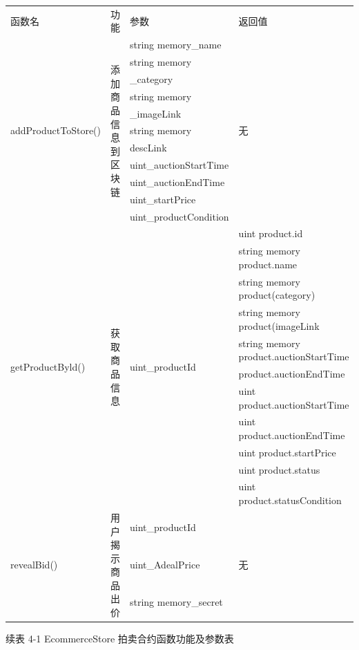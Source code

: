 \documentclass[
  10
]{article}
\newcounter{none} %
\begin{document}
{\def\LTcaptype{none} %
\begin{longtable}[]{@{}llll@{}}
\toprule\noalign{}
\endhead
\bottomrule\noalign{}
\endlastfoot
函数名 & 功能 & 参数 & 返回值 \\
\multirow{11}{*}{addProductToStore()} &
\multirow{11}{*}{添加商品信息到区块链} & string memory\_name & \\
& & string memory & \\
& & \_category & \\
& & string memory & \\
& & \_imageLink & \\
& & string memory & 无 \\
& & descLink & \\
& & uint\_auctionStartTime & \\
& & uint\_auctionEndTime & \\
& & uint\_startPrice & \\
& & uint\_productCondition & \\
\multirow{11}{*}{getProductByld()} & \multirow{11}{*}{获取商品信息} &
\multirow{11}{*}{uint\_productId} & uint product.id \\
& & & string memory product.name \\
& & & string memory product(category) \\
& & & string memory product(imageLink \\
& & & string memory product.auctionStartTime \\
& & & product.auctionEndTime \\
& & & uint product.auctionStartTime \\
& & & uint product.auctionEndTime \\
& & & uint product.startPrice \\
& & & uint product.status \\
& & & uint product.statusCondition \\
\multirow{3}{*}{revealBid()} & \multirow{3}{*}{用户揭示商品出价} &
uint\_productId & \\
& & uint\_AdealPrice & 无 \\
& & string memory\_secret & \\
\end{longtable}
}

续表 4-1 EcommerceStore 拍卖合约函数功能及参数表
\end{document}
